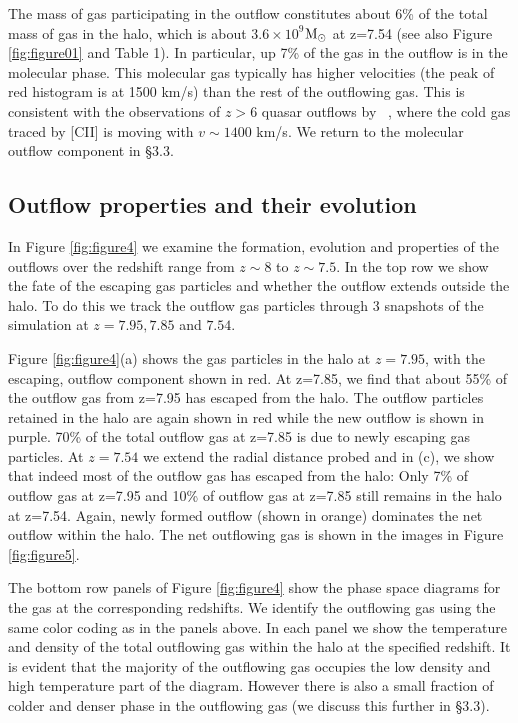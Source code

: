 \documentclass[a4paper,usenatbib]{mnras}
\begin{document}
The mass of gas participating in the outflow constitutes about 6\% of the total mass of gas in the halo, which is about $3.6\times10^{9}$${\rm M}_\odot$ at z=7.54 (see also Figure \ref{fig:figure01} and Table 1).
In particular, up 7\% of the gas in the outflow is in the molecular phase. This molecular gas typically has higher velocities (the peak of red histogram is at 1500 km/s) than the rest of the outflowing gas.  This is consistent with the observations of $z>6$ quasar outflows by ~\citep{Maiolino,Cicone2015}, where the cold gas traced by [CII] is moving with $v \sim 1400$ km/s.
We return to the molecular outflow component in \S 3.3.

\subsection{Outflow properties and their evolution}

In Figure \ref{fig:figure4}
we examine the formation, evolution and properties
of the outflows over the redshift range from $z\sim8$ to $z\sim7.5$.
In the top row we show the fate of the escaping gas particles and whether the outflow extends outside the halo. To do this we track the outflow gas particles through 3 snapshots of the simulation at $z=7.95, 7.85$ and $7.54$.  

Figure \ref{fig:figure4}(a) shows the gas particles in the halo at $z=7.95$, with the escaping, outflow component shown in red. At z=7.85, we find that about 55\% of the outflow gas from z=7.95 has escaped from the halo. The outflow particles retained in the halo are again shown in red while 
the new outflow is shown in purple. 70\% of the total outflow gas at z=7.85 is due to newly escaping gas particles. At $z=7.54$
we extend the radial distance probed and 
in (c), we show that indeed  most of the outflow gas has escaped from the halo: Only 7\% of outflow gas at z=7.95 and 10\% of outflow gas at z=7.85 still remains in the halo at z=7.54. Again, newly formed outflow (shown in orange) dominates the net outflow within the halo.
The net outflowing gas is shown
in the images in Figure \ref{fig:figure5}.

The bottom row panels of Figure \ref{fig:figure4} show
the phase space diagrams for the gas at the corresponding redshifts. We identify the outflowing gas using the same color coding as in the panels above. In each panel we show the temperature and density of the total outflowing gas within the halo at the specified redshift.
It is evident that the majority of the outflowing gas occupies the low density and high temperature part of the diagram.
However there is also a small fraction of colder and denser phase in the outflowing gas
(we discuss this further in \S 3.3).
\end{document}
